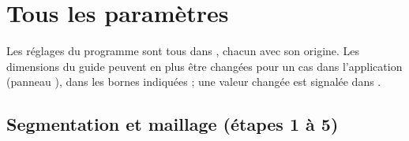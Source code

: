 \chapter{Tous les paramètres}
\label{ann:parametres}

\begin{chapeau}
Les réglages du programme sont tous dans , chacun avec son origine. Les dimensions
du guide peuvent en plus être changées pour un cas dans l'application (panneau ),
dans les bornes indiquées ; une valeur changée est signalée dans .
\end{chapeau}

\section{Segmentation et maillage (étapes 1 à 5)}

